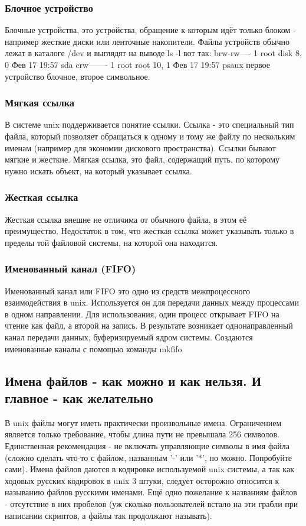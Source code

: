 \subsubsection{Блочное устройство}
Блочные устройства, это устройства, обращение к которым идёт только блоком - например жесткие диски или ленточные накопители. Файлы устройств обычно лежат в каталоге /dev и выглядят на выводе ls -l вот так:
brw-rw---- 1 root disk      8,   0 Фев 17 19:57 sda
crw------- 1 root root     10,   1 Фев 17 19:57 psaux
первое устройство блочное, второе символьное.
\subsubsection{Мягкая ссылка}
В системе unix поддерживается понятие ссылки. Ссылка - это специальный тип файла, который позволяет обращаться к одному и тому же файлу по нескольким именам (например для экономии дискового пространства).
Ссылки бывают мягкие и жесткие. Мягкая ссылка, это файл, содержащий путь, по которому нужно искать объект, на который указывает ссылка.
\subsubsection{Жесткая ссылка}
Жесткая ссылка внешне не отличима от обычного файла, в этом её преимущество. Недостаток в том, что жесткая ссылка может указывать только в пределы той файловой системы, на  которой она находится.
\subsubsection{Именованный канал (FIFO)}
Именованный канал или FIFO это одно из средств межпроцессного взаимодействия в unix. Используется он для передачи данных между процессами в одном направлении. Для использования, один процесс открывает FIFO на чтение как файл, а второй на запись. В результате возникает однонаправленный канал передачи данных, буферизируемый ядром системы. Создаются именованные каналы с помощью команды mkfifo
\subsection{Имена файлов - как можно и как нельзя. И главное - как желательно}
В unix файлы могут иметь практически произвольные имена. Ограничением является только требование, чтобы длина пути не превышала 256 символов. Единственная рекомендация - не включать управляющие символы в имя файла (сложно сделать что-то с файлом, названным '-' или '*', но можно. Попробуйте сами).
Имена файлов даются в кодировке используемой unix системы, а так как ходовых русских кодировок в unix 3 штуки, следует осторожно относится к называнию файлов русскими именами.
Ещё одно пожелание к названиям файлов - отсутствие в них пробелов (уж сколько пользователей встало на эти грабли при написании скриптов, а файлы так продолжают называть).
